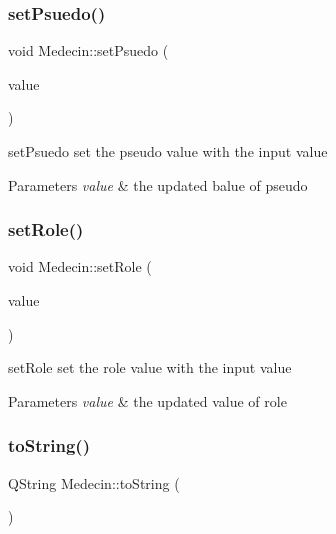 \subsubsection{\texorpdfstring{setPsuedo()}{setPsuedo()}}
{\footnotesize\ttfamily void Medecin\+::set\+Psuedo (\begin{DoxyParamCaption}\item[{const Q\+String \&}]{value }\end{DoxyParamCaption})}



set\+Psuedo set the pseudo value with the input value 


\begin{DoxyParams}{Parameters}
{\em value} & the updated balue of pseudo \\
\hline
\end{DoxyParams}
\mbox{\label{class_medecin_ae98a1e8b43f23aeaf151e300e568c43f}} 
\subsubsection{\texorpdfstring{setRole()}{setRole()}}
{\footnotesize\ttfamily void Medecin\+::set\+Role (\begin{DoxyParamCaption}\item[{const Q\+String \&}]{value }\end{DoxyParamCaption})}



set\+Role set the role value with the input value 


\begin{DoxyParams}{Parameters}
{\em value} & the updated value of role \\
\hline
\end{DoxyParams}
\mbox{\label{class_medecin_ae009584f0888a6d2d368f61dc768e192}} 
\subsubsection{\texorpdfstring{toString()}{toString()}}
{\footnotesize\ttfamily Q\+String Medecin\+::to\+String (\begin{DoxyParamCaption}{ }\end{DoxyParamCaption})}



